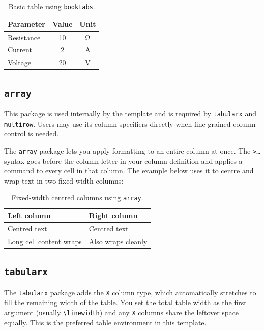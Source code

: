 \begin{table}[H]
	\centering
	\caption{Basic table using \texttt{booktabs}.}
	\label{tab:booktabs}
	\begin{tabular}{@{}lcc@{}}
		\toprule
		Parameter & Value & Unit \\
		\midrule
		Resistance & 10 & \si{\ohm} \\
		Current    & 2  & \si{\ampere} \\
		Voltage    & 20 & \si{\volt} \\
		\bottomrule
	\end{tabular}
\end{table}

\subsection{\texttt{array}}
\noindent\colorbox{themecolour!15}{\parbox{\linewidth}{\small This package is used internally by the template and is required by \texttt{tabularx} and \texttt{multirow}. Users may use its column specifiers directly when fine-grained column control is needed.}}\vspace{0.5\baselineskip}

The \texttt{array} package lets you apply formatting to an entire column at once. The \texttt{>{\ldots}} syntax goes before the column letter in your column definition and applies a command to every cell in that column. The example below uses it to centre and wrap text in two fixed-width columns:

\begin{table}[H]
	\centering
	\caption{Fixed-width centred columns using \texttt{array}.}
	\label{tab:array}
	\begin{tabular}{>{\centering\arraybackslash}p{4cm} >{\centering\arraybackslash}p{4cm}}
		\toprule
		Left column & Right column \\
		\midrule
		Centred text & Centred text \\
		Long cell content wraps & Also wraps cleanly \\
		\bottomrule
	\end{tabular}
\end{table}

\subsection{\texttt{tabularx}}
The \texttt{tabularx} package adds the \texttt{X} column type, which automatically stretches to fill the remaining width of the table. You set the total table width as the first argument (usually \texttt{\textbackslash linewidth}) and any \texttt{X} columns share the leftover space equally. This is the preferred table environment in this template.

